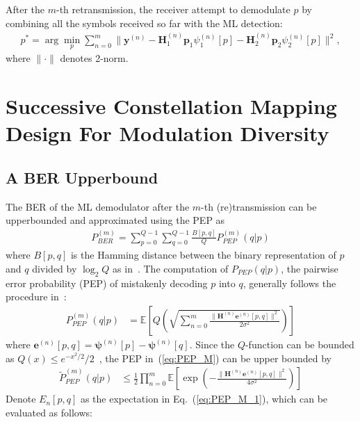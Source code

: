 \documentclass[journal,draftcls,onecolumn,12pt,twoside]{IEEEtran}
\begin{document}
After the $m$-th retransmission, the receiver attempt to
demodulate $p$ by combining all the symbols received so far with the ML
detection:
\begin{align}
    p^* = \arg\min_p\sum_{n = 0}^{m}\|\mathbf{y}^{(n)} -
    \mathbf{H}_1^{(n)}\mathbf{p}_1\psi_1^{(n)}[p] -
    \mathbf{H}_2^{(n)}\mathbf{p}_2\psi_2^{(n)}[p]\|^2,
\end{align}
where $\|\cdot\|$ denotes 2-norm.

\section{Successive Constellation Mapping Design For Modulation Diversity}
\label{sec:modiv}

\subsection{A BER Upperbound}
\label{ssec:ber}
The BER of the ML demodulator after the $m$-th (re)transmission can be
upperbounded and approximated using the PEP as
\begin{align}
  P_{BER}^{(m)} = \sum_{p=0}^{Q - 1}\sum_{q=0}^{Q - 1}\frac{B[p,
  q]}{Q}P_{PEP}^{(m)}(q|p) \label{eq:P_BER}
\end{align}
where $B[p, q]$ is the Hamming distance between the binary
representation of $p$ and $q$ divided by $\log_2Q$ as
in~\cite{samra2005symbol}. The computation of $P_{PEP}(q|p)$, the pairwise
error probability (PEP) of mistakenly decoding $p$ into $q$, generally follows
the procedure in~\cite{han2009performance}:
\begin{align}
    P_{PEP}^{(m)}(q|p) & = \mathbb{E}
    \left[Q\left(\sqrt{\sum_{n=0}^m\frac{\|\mathbf{H}^{(n)}
    \mathbf{e}^{(n)}[p,q]\|^2} {2\sigma^2}}\right)\right]
    \label{eq:PEP_M}
\end{align}
where $\mathbf{e}^{(n)}[p,q] = \bm{\psi}^{(n)}[p] - \bm{\psi}^{(n)}[q]$. Since the
$Q$-function can be bounded as $Q(x)\leq e^{-x^2/2}/2$~\cite{proakisdigital},
the PEP in~(\ref{eq:PEP_M}) can be upper bounded by
\begin{align}
    \tilde{P}_{PEP}^{(m)}(q|p) &\leq
    \frac{1}{2} \prod_{n=0}^{m}
    \mathbb{E}\left[\exp\left(-\frac{\|\mathbf{H}^{(n)}
    \mathbf{e}^{(n)}[p,q]\|^2}{4\sigma^2}\right)\right]
    \label{eq:PEP_M_1}
\end{align}
Denote $E_n[p,q]$ as the expectation in Eq.~(\ref{eq:PEP_M_1}), which can be
evaluated as follows:
\end{document}
